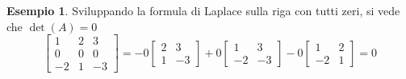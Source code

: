 \documentclass{book}
\theoremstyle{definition}
\newtheorem{es}{Esempio}[section]
\theoremstyle{plain}
\begin{document}
\begin{es}
  \label{es:prodeldet6}
  Sviluppando la formula di Laplace sulla riga con tutti zeri, si vede
  che $\det(A)=0$
  \begin{equation*}
    \begin{bmatrix}
      1 & 2 & 3\\
      0 & 0 & 0\\
      -2 & 1 & -3
    \end{bmatrix} = -0
    \begin{bmatrix}
      2 & 3\\
      1 & -3
    \end{bmatrix}+ 0
    \begin{bmatrix}
      1 & 3\\
      -2 & -3
    \end{bmatrix}-0
    \begin{bmatrix}
      1 & 2 \\
      -2 & 1
    \end{bmatrix}= 0
  \end{equation*}
\end{es}
\end{document}
